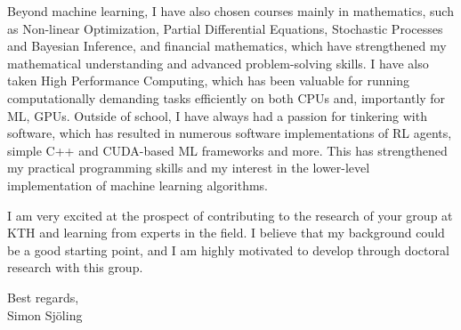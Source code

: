 \documentclass[A4,11pt]{letter}
\begin{document}
Beyond machine learning, I have also chosen courses mainly in mathematics, such as Non-linear Optimization, Partial Differential Equations, Stochastic Processes and Bayesian Inference, and financial mathematics, which have strengthened my mathematical understanding and advanced problem-solving skills. I have also taken High Performance Computing, which has been valuable for running computationally demanding tasks efficiently on both CPUs and, importantly for ML, GPUs.
\newpage
Outside of school, I have always had a passion for tinkering with software, which has resulted in numerous software implementations of RL agents, simple C++ and CUDA-based ML frameworks and more. This has strengthened my practical programming skills and my interest in the lower-level implementation of machine learning algorithms.

I am very excited at the prospect of contributing to the research of your group at KTH and learning from experts in the field. I believe that my background could be a good starting point, and I am highly motivated to develop through doctoral research with this group.

Best regards,\\
Simon Sjöling
\end{document}
